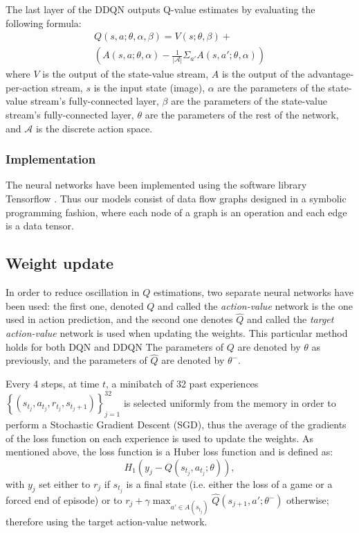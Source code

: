 \documentclass[letterpaper]{article}
\begin{document}
The last layer of the DDQN outputs Q-value estimates by evaluating the following formula:
\begin{multline}
    Q(s, a; \theta, \alpha, \beta) = V(s; \theta, \beta) + \\ ( A(s, a; \theta, \alpha) - \frac{1}{|\mathcal{A}|} \Sigma_{a'} A(s, a'; \theta, \alpha) )
\end{multline}
where $V$ is the output of the state-value stream, $A$ is the output of the advantage-per-action stream, $s$ is the input state (image), 
$\alpha$ are the parameters of the state-value stream's fully-connected layer, $\beta$ are the parameters of the state-value stream's
fully-connected layer, $\theta$ are the parameters of the rest of the network, and $\mathcal{A}$ is the discrete action space.

\subsubsection{Implementation}
The neural networks have been implemented using the software library Tensorflow \citep{tensorflow2015-whitepaper}.
Thus our models consist of data flow graphs designed in a symbolic programming fashion, where each node of a graph is an operation
and each edge is a data tensor.

\subsection{Weight update}

In order to reduce oscillation in $Q$ estimations, two separate neural networks have been used: the first one, denoted $Q$ and called the \textit{action-value}
network is the one used in action prediction, and the second one denotes $\hat Q$ and called the \textit{target action-value} network is used when
updating the weights. This particular method holds for both DQN and DDQN The parameters of $Q$ are denoted by $\theta$ as previously, and the parameters of $\hat Q$ are denoted by $\theta^-$.

Every 4 steps, at time $t$, a minibatch of 32 past experiences $\left\{(s_{t_j}, a_{t_j}, r_{t_j}, s_{t_j+1})\right\}_{j=1}^{32}$ is selected uniformly from the
memory in order to perform a Stochastic Gradient Descent (SGD), thus the average of the gradients of the loss function on each experience is used to update
the weights. As mentioned above, the loss function is a Huber loss function and is defined as:
\begin{equation}
	H_1\left(y_j - Q(s_{t_j}, a_{t_j}; \theta)\right),
\end{equation}
with $y_j$ set either to $r_j$ if $s_{t_j}$ is a final state (i.e. either the loss of a game or a forced end of episode) or to
$r_j + \gamma\max_{a' \in A(s_{t_j})}\hat Q(s_{j+1}, a'; \theta^-)$ otherwise; therefore using the target action-value network.
\end{document}
